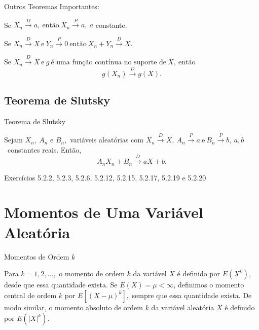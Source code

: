 \documentclass[12pt]{beamer}
\begin{document}
\begin{frame}{Outros Teoremas Importantes:}
\begin{Teorema}
\justifying
Se $X_{n} \overset{D}{\rightarrow} a,~\text{então}~X_{n} \overset{P}{\rightarrow} a,~a$ constante.
\end{Teorema}
\pause
\begin{Teorema}
\justifying
Se $X_{n} \overset{D}{\rightarrow} X~\text{e}~Y_{n} \overset{P}{\rightarrow} 0~\text{então}~X_{n}+Y_{n} \overset{D}{\rightarrow} X.$
\end{Teorema}
\pause
\begin{Teorema}
\justifying
Se $X_{n} \overset{D}{\rightarrow} X~\text{e}~g~\text{é uma função contínua no suporte de}~X,~\text{então}~$ $$g(X_{n}) \overset{D}{\rightarrow} g(X).$$
\end{Teorema}
\end{frame}

\subsection{Teorema de Slutsky}
\begin{frame}{Teorema de Slutsky}
\begin{Teorema}
\justifying
Sejam $X_{n},~A_{n}$ e $B_{n},$ variáveis aleatórias com $X_{n} \overset{D}{\rightarrow} X,~A_{n} \overset{P}{\rightarrow} a~\text{e}~B_{n} \overset{P}{\rightarrow} b,~a,b$~constantes reais. Então, $$A_{n}X_{n}+B_{n} \overset{D}{\rightarrow} aX+b.$$
\end{Teorema}
\end{frame}

\begin{frame}{}
\begin{block}{\Home}
	\nocite{hogg}
\justifying
Exercícios 5.2.2, 5.2.3, 5.2.6, 5.2.12, 5.2.15, 5.2.17, 5.2.19 e 5.2.20
\end{block}
\end{frame}

\section{Momentos de Uma Variável Aleatória}
\begin{frame}{Momentos de Ordem $k$}
	\begin{definicao}\label{def4}
		\justifying
		Para $k=1,2,\dots,$ o momento de ordem $k$ da variável $X$ é definido por $E(X^{k}),$ desde que essa quantidade exista. Se $E(X)=\mu<\infty$, definimos o momento central de ordem $k$ por $E[(X-\mu)^{k}],$ sempre que essa quantidade exista. De modo similar, o momento absoluto de ordem $k$ da variável aleatória $X$ é definido por $E(|X|^{k}).$
	\end{definicao}
\end{frame}
\end{document}
